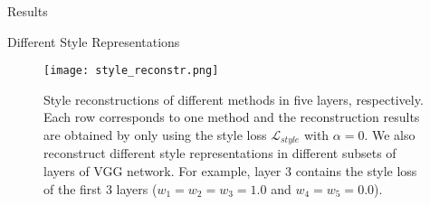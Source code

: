 \begin{section}{Results}
\begin{subsection}{Different Style Representations}


\begin{figure}[htpb]
\begin{center}
	\texttt{[image: style\_reconstr.png]}
\end{center}
\vspace{-2mm}
	\caption{Style reconstructions of different methods in five layers, respectively. Each row corresponds to one method and the reconstruction results are obtained by only using the style loss $\mathcal{L}_{style}$ with $\alpha=0$. We also reconstruct different style representations in different subsets of layers of VGG network. For example, layer 3 contains the style loss of the first 3 layers ($w_1=w_2=w_3=1.0$ and $w_4=w_5=0.0$).%
	} \label{fig:style_reconstr}
\vspace{-2mm}
\end{figure}





\end{subsection}
\end{section}
